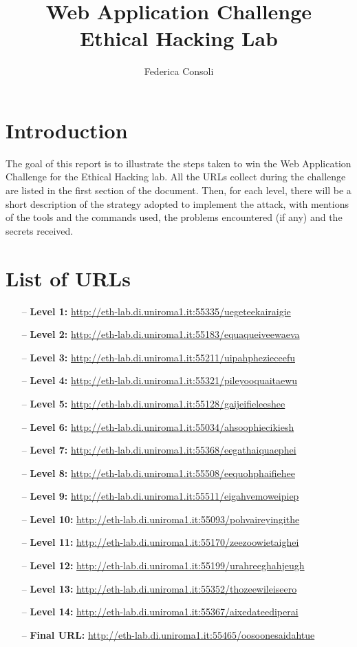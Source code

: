 \documentclass[12pt,a4paper]{article}
\author{Federica Consoli}
\title{Web Application Challenge \\ \large Ethical Hacking Lab}
\begin{document}
	\maketitle
	\section*{Introduction}
		The goal of this report is to illustrate the steps taken to win the Web Application Challenge for the Ethical Hacking lab. All the URLs collect during the challenge are listed in the first section of the document. Then, for each level, there will be a short description of the strategy adopted to implement the attack, with mentions of the tools and the commands used, the problems encountered (if any) and the secrets received.\\
	
		 
	\section{List of URLs}
	\begin{itemize}
		\item[--] \textbf{Level 1: }\url{http://eth-lab.di.uniroma1.it:55335/uegeteekairaigie }
		\item[--]\textbf{Level 2: }\url{http://eth-lab.di.uniroma1.it:55183/equaqueiveewaeva}
		\item[--]\textbf{Level 3: }\url{http://eth-lab.di.uniroma1.it:55211/uipahphezieceefu}
		\item[--]\textbf{Level 4: }\url{http://eth-lab.di.uniroma1.it:55321/pileyooquaitaewu}
		\item[--]\textbf{Level 5: }\url{http://eth-lab.di.uniroma1.it:55128/gaijeifieleeshee}
		\item[--]\textbf{Level 6: }\url{http://eth-lab.di.uniroma1.it:55034/ahsoophiecikiesh }
		\item[--]\textbf{Level 7: }\url{http://eth-lab.di.uniroma1.it:55368/eegathaiquaephei}
		\item[--]\textbf{Level 8: }\url{http://eth-lab.di.uniroma1.it:55508/eequohphaifiehee}
		\item[--]\textbf{Level 9: }\url{http://eth-lab.di.uniroma1.it:55511/eigahvemoweipiep}
		\item[--]\textbf{Level 10: }\url{http://eth-lab.di.uniroma1.it:55093/pohvaireyingithe}
		\item[--]\textbf{Level 11: }\url{http://eth-lab.di.uniroma1.it:55170/zeezoowietaighei}
		\item[--]\textbf{Level 12: }\url{http://eth-lab.di.uniroma1.it:55199/urahreeghahjeugh}
		\item[--]\textbf{Level 13: }\url{http://eth-lab.di.uniroma1.it:55352/thozeewileiseero}
		\item[--]\textbf{Level 14: }\url{http://eth-lab.di.uniroma1.it:55367/aixedateediperai}
		\item[--] \textbf{Final URL: }\url{http://eth-lab.di.uniroma1.it:55465/oosoonesaidahtue}
	\end{itemize}
	
\end{document}
